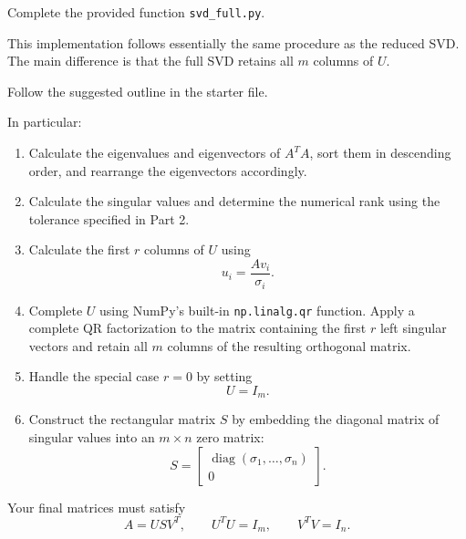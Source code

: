 \documentclass{ximera}
\begin{document}
Complete the provided function \texttt{svd\_full.py}.

This implementation follows essentially the same procedure as
the reduced SVD. The main difference is that the full SVD retains
all $m$ columns of $U$.

Follow the suggested outline in the starter file.

In particular:

\begin{enumerate}

    \item Calculate the eigenvalues and eigenvectors of $A^TA$,
    sort them in descending order, and rearrange the eigenvectors
    accordingly.

    \item Calculate the singular values and determine the
    numerical rank using the tolerance specified in Part 2.

    \item Calculate the first $r$ columns of $U$ using
    \[
    u_i=\frac{Av_i}{\sigma_i}.
    \]

    \item Complete $U$ using NumPy's built-in \texttt{np.linalg.qr}
    function. Apply a complete QR factorization to the matrix
    containing the first $r$ left singular vectors and retain
    all $m$ columns of the resulting orthogonal matrix.

    \item Handle the special case $r=0$ by setting
    \[
    U=I_m.
    \]

    \item Construct the rectangular matrix $S$ by embedding
    the diagonal matrix of singular values into an $m\times n$
    zero matrix:
    \[
    S=
    \begin{bmatrix}
    \operatorname{diag}(\sigma_1,\ldots,\sigma_n)\\
    0
    \end{bmatrix}.
    \]

\end{enumerate}

Your final matrices must satisfy
\[
A=USV^T,\qquad U^TU=I_m,\qquad V^TV=I_n.
\]
\end{document}
